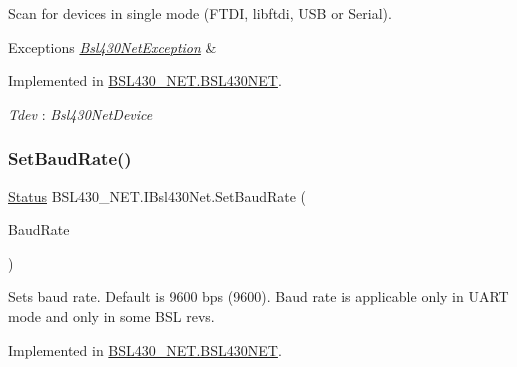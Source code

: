 Scan for devices in single mode (F\+T\+DI, libftdi, U\+SB or Serial). 


\begin{DoxyExceptions}{Exceptions}
{\em \mbox{\hyperlink{class_b_s_l430___n_e_t_1_1_bsl430_net_exception}{Bsl430\+Net\+Exception}}} & \\
\hline
\end{DoxyExceptions}


Implemented in \mbox{\hyperlink{class_b_s_l430___n_e_t_1_1_b_s_l430_n_e_t_a0299d3468b1a5c2f4facf0bacfaa6bb0}{B\+S\+L430\+\_\+\+N\+E\+T.\+B\+S\+L430\+N\+ET}}.

\begin{Desc}
\item[Type Constraints]\begin{description}
\item[{\em Tdev} : {\em Bsl430\+Net\+Device}]\end{description}
\end{Desc}
\mbox{\label{interface_b_s_l430___n_e_t_1_1_i_bsl430_net_a4ce151c0bd961d76dc9dfa2b07788b99}} 
\subsubsection{\texorpdfstring{SetBaudRate()}{SetBaudRate()}}
{\footnotesize\ttfamily \mbox{\hyperlink{class_b_s_l430___n_e_t_1_1_status}{Status}} B\+S\+L430\+\_\+\+N\+E\+T.\+I\+Bsl430\+Net.\+Set\+Baud\+Rate (\begin{DoxyParamCaption}\item[{\mbox{\hyperlink{namespace_b_s_l430___n_e_t_a8d30c263598635a481840944d38aeb70}{Baud\+Rate}}}]{Baud\+Rate }\end{DoxyParamCaption})}



Sets baud rate. Default is 9600 bps (9600). Baud rate is applicable only in U\+A\+RT mode and only in some B\+SL revs. 



Implemented in \mbox{\hyperlink{class_b_s_l430___n_e_t_1_1_b_s_l430_n_e_t_a6d01c3021cc44318ab8ee695a910ecfd}{B\+S\+L430\+\_\+\+N\+E\+T.\+B\+S\+L430\+N\+ET}}.

\mbox{\label{interface_b_s_l430___n_e_t_1_1_i_bsl430_net_a5edac897ededd878d53097ac4e9c6782}} 
